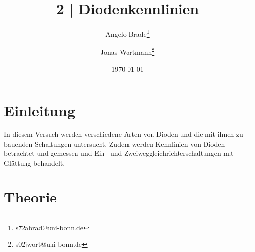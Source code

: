 \documentclass[a4paper,10pt]{article}
\numberwithin{equation}{section}
\begin{document}
\begin{titlepage}
	\title{2 $|$ Diodenkennlinien}
	\author[1]{Angelo Brade\thanks{s72abrad@uni-bonn.de}}
	\author[1]{Jonas Wortmann\thanks{s02jwort@uni-bonn.de}}
	\date{\today}
\end{titlepage}

\maketitle
{}


\newpage


\fancyhead[R]{\thepage}
\fancyfoot[C]{}

\tableofcontents


\newpage


\fancyhead[L]{\leftmark}

\section{Einleitung}
In diesem Versuch werden verschiedene Arten von Dioden und die mit ihnen zu bauenden Schaltungen untersucht.
Zudem werden Kennlinien von Dioden betrachtet und gemessen und Ein-- und Zweiweggleichrichterschaltungen mit Glättung behandelt.

\newpage
\section{Theorie}
\end{document}
